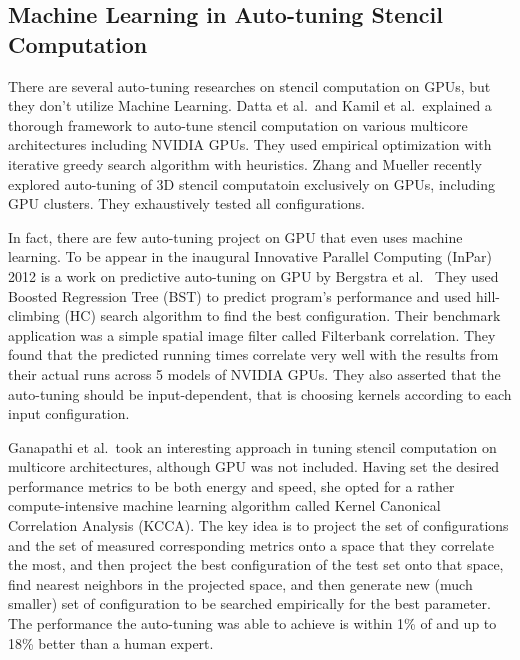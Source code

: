 \subsection{Machine Learning in Auto-tuning Stencil Computation}
There are several auto-tuning researches on stencil computation on GPUs, but they don't utilize Machine Learning. Datta et al.\ and Kamil et al.\ explained a thorough framework to auto-tune stencil computation on various multicore architectures including NVIDIA GPUs. They used empirical optimization with iterative greedy search algorithm with heuristics. \cite{datta08, datta09, shoaib10} Zhang and Mueller recently explored auto-tuning of 3D stencil computatoin exclusively on GPUs, including GPU clusters. They exhaustively tested all configurations. \cite{zhang12}

In fact, there are few auto-tuning project on GPU that even uses machine learning. To be appear in the inaugural Innovative Parallel Computing (InPar) 2012 is a work on predictive auto-tuning on GPU by Bergstra et al.\ \cite{inpar2012} They used Boosted Regression Tree (BST) to predict program's performance and used hill-climbing (HC) search algorithm to find the best configuration. Their benchmark application was a simple spatial image filter called Filterbank correlation. They found that the predicted running times correlate very well with the results from their actual runs across 5 models of NVIDIA GPUs. They also asserted that the auto-tuning should be input-dependent, that is choosing kernels according to each input configuration.

Ganapathi et al.\ took an interesting approach in tuning stencil computation on multicore architectures, although GPU was not included. \cite{KCCA} Having set the desired performance metrics to be both energy and speed, she opted for a rather compute-intensive machine learning algorithm called Kernel Canonical Correlation Analysis (KCCA). The key idea is to project the set of configurations and the set of measured corresponding metrics onto a space that they correlate the most, and then project the best configuration of the test set onto that space, find nearest neighbors in the projected space, and then generate new (much smaller) set of configuration to be searched empirically for the best parameter. The performance the auto-tuning was able to achieve is within 1\% of and up to 18\% better than a human expert.

